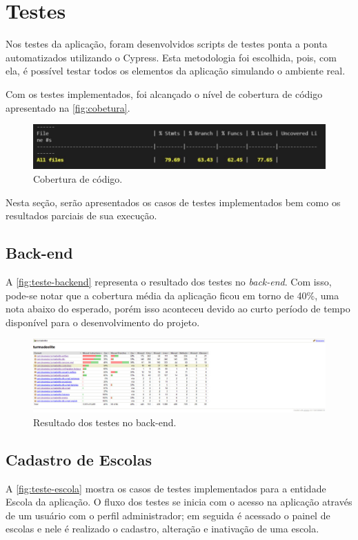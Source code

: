 \section{Testes}
Nos testes da aplicação, foram desenvolvidos scripts de testes ponta a ponta automatizados utilizando o Cypress. Esta metodologia foi escolhida, pois, com ela, é possível testar todos os elementos da aplicação simulando o ambiente real. 

Com os testes implementados, foi alcançado o nível de cobertura de código apresentado na \autoref{fig:cobetura}.

\begin{figure}[htb]
    \centering
	\includegraphics[width=16cm]{imagens/Coberturadetestes.JPG}
	\caption{\label{fig:cobetura} Cobertura de código.}
\end{figure}

Nesta seção, serão apresentados os casos de testes implementados bem como os resultados parciais de sua execução.
\subsection{Back-end}
A \autoref{fig:teste-backend} representa o resultado dos testes no \textit{\gls{back-end}}. Com isso, pode-se notar que a cobertura média da aplicação ficou em torno de 40\%, uma nota abaixo do esperado, porém isso aconteceu devido ao curto período de tempo disponível para o desenvolvimento do projeto.
\begin{figure}[htb]
    \centering
	\includegraphics[width=16cm]{imagens/TesteBackend.jpg}
	\caption{\label{fig:teste-backend} Resultado dos testes no back-end.}
\end{figure}

\subsection{Cadastro de Escolas}
A \autoref{fig:teste-escola} mostra os casos de testes implementados para a entidade Escola da aplicação. O fluxo dos testes se inicia com o acesso na aplicação através de um usuário com o perfil administrador; em seguida é acessado o painel de escolas e nele é realizado o cadastro, alteração e inativação de uma escola.


